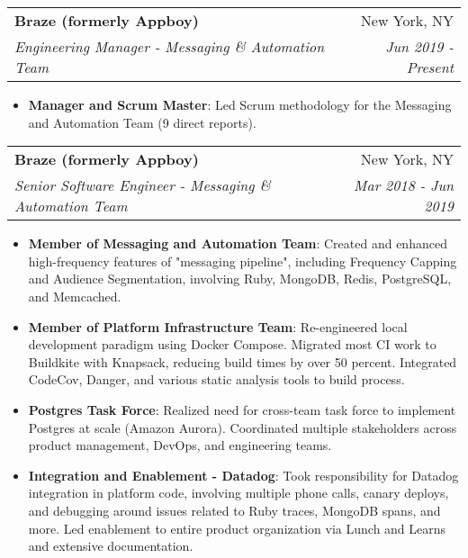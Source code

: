\documentclass[letterpaper,10pt]{article}
\makeatletter
\newcommand{\resumeItem}[2]{
  \item\small{
    \textbf{#1}{: #2 \vspace{-2pt}}
  }
}
\newcommand{\resumeSubheading}[4]{
  \vspace{-1pt}\item
    \begin{tabular*}{0.97\textwidth}{l@{\extracolsep{\fill}}r}
      \textbf{#1} & #2 \\
      \textit{\small#3} & \textit{\small #4} \\
    \end{tabular*}\vspace{-5pt}
}
\newcommand{\resumeItemListStart}{\begin{itemize}}
\newcommand{\resumeItemListEnd}{\end{itemize}\vspace{-5pt}}
\makeatother
\begin{document}
    \resumeSubheading
      {Braze (formerly Appboy)}{New York, NY}
      {Engineering Manager - Messaging \& Automation Team}{Jun 2019 - Present}
       \resumeItemListStart
        \resumeItem{Manager and Scrum Master}
          {Led Scrum methodology for the Messaging and Automation Team (9 direct reports).}
      \resumeItemListEnd
    \resumeSubheading
      {Braze (formerly Appboy)}{New York, NY}
      {Senior Software Engineer - Messaging \& Automation Team}{Mar 2018 - Jun 2019}
      \resumeItemListStart
        \resumeItem{Member of Messaging and Automation Team}
          {Created and enhanced high-frequency features of "messaging pipeline", including Frequency Capping and Audience Segmentation, involving Ruby, MongoDB, Redis, PostgreSQL, and Memcached.}
        \resumeItem{Member of Platform Infrastructure Team}
          {Re-engineered local development paradigm using Docker Compose. Migrated most CI work to Buildkite with Knapsack, reducing build times by over 50 percent. Integrated CodeCov, Danger, and various static analysis tools to build process.}
        \resumeItem{Postgres Task Force}
          {Realized need for cross-team task force to implement Postgres at scale (Amazon Aurora). Coordinated multiple stakeholders across product management, DevOps, and engineering teams.}
        \resumeItem{Integration and Enablement - Datadog}
          {Took responsibility for Datadog integration in platform code, involving multiple phone calls, canary deploys, and debugging around issues related to Ruby traces, MongoDB spans, and more. Led enablement to entire product organization via Lunch and Learns and extensive documentation.}
      \resumeItemListEnd
\end{document}
